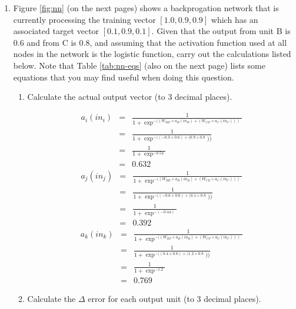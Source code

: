 \documentclass[--SOLUTION-OPTION--]{ditpaper}
\begin{document}
\begin{enumerate}
		\item Figure \ref{fig:nn} (on the next pages) shows a backprogation network that is currently processing the training vector $[1.0, 0.9, 0.9]$ which has an  associated target vector $[0.1, 0.9, 0.1]$. Given that the output from unit B is $0.6$ and from C is $0.8$, and assuming that the activation function used at all nodes in the network is the logistic function, carry out the calculations listed below. Note that Table \ref{tab:nn-eqs} (also on the next page) lists some equations that you may find useful when doing this question. 
\begin{enumerate}
	\item Calculate the actual output vector (to 3 decimal places).
		\begin{answer}
		\begin{eqnarray*}
		a_i(in_i) &=&\frac{1}{1 + \exp^{- ((W_{BD} \times a_B(in_B) + (W_{CD} \times a_C(in_C) ))}}\\
		&=&\frac{1}{1 + \exp^{- ((-0.3 \times 0.6) + (0.9 \times 0.8}))}\\
		&=&\frac{1}{1 + \exp^{- 0.54}}\\
		&=&0.632
		\end{eqnarray*}
		\begin{eqnarray*}
		a_j(in_j) &=&\frac{1}{1 + \exp^{- ((W_{BE} \times a_B(in_B) + (W_{CE} \times a_C(in_C) ))}}\\
		& = &\frac{1}{1 + \exp^{- ((-0.6 \times 0.6) + (0.1 \times 0.8}))}\\
		& = &\frac{1}{1 + \exp^{- (-0.44)}}\\
		& = &0.392
		\end{eqnarray*}
		\begin{eqnarray*}
		a_k(in_k) &=&\frac{1}{1 + \exp^{- ((W_{BF} \times a_B(in_B) + (W_{CF} \times a_C(in_C) ))}}\\
		& = &\frac{1}{1 + \exp^{- ((0.4 \times 0.6) + (1.2 \times 0.8}))}\\
		& = &\frac{1}{1 + \exp^{- 1.2}}\\
		& = &0.769
		\end{eqnarray*}
		\end{answer}
	\item Calculate the \textbf{$\Delta$} error for each output unit (to 3 decimal places).

\end{enumerate}
\end{enumerate}
\end{document}
